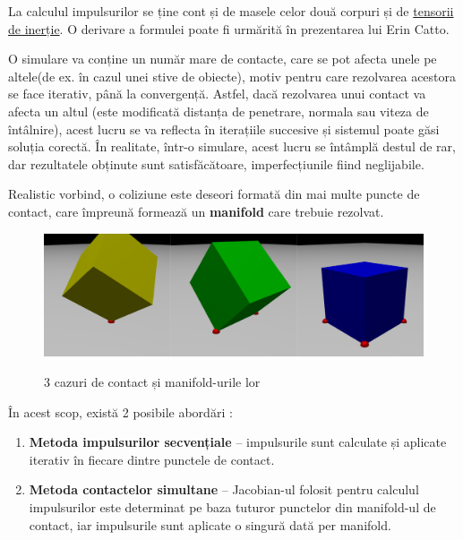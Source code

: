 \documentclass[12pt,a4paper]{report}
\begin{document}
La calculul impulsurilor se ține cont și de masele celor două corpuri și de \hyperref[inertia_tensor]{tensorii de inerție}. O derivare a formulei poate fi urmărită în prezentarea lui Erin Catto\cite{constraints_catto}.


O simulare va conține un număr mare de contacte, care se pot afecta unele pe altele(de ex. în cazul unei stive de obiecte), motiv pentru care rezolvarea acestora se face iterativ, până la convergență. Astfel, dacă rezolvarea unui contact va afecta un altul (este modificată distanța de penetrare, normala sau viteza de întâlnire), acest lucru se va reflecta în iterațiile succesive și sistemul poate găsi soluția corectă. În realitate, într-o simulare, acest lucru se întâmplă destul de rar, dar rezultatele obținute sunt satisfăcătoare, imperfecțiunile fiind neglijabile.

Realistic vorbind, o coliziune este deseori formată din mai multe puncte de contact, care împreună formează un \textbf{manifold} care trebuie rezolvat.
\begin{figure}[H]
	\centering
	\includegraphics[width=0.7\linewidth]{pics/cap3_03.png}
	\label{fig:cap3_03}
	\caption[]{3 cazuri de contact și manifold-urile lor}
\end{figure}
În acest scop, există 2 posibile abordări \cite[Secțiunea 6.6.2~\textit{Collision response for colliding contact}]{game_physics_eberly}:
\begin{enumerate}
	\item \textbf{Metoda impulsurilor secvențiale} -- impulsurile sunt calculate și aplicate iterativ în fiecare dintre punctele de contact.
	\item \textbf{Metoda contactelor simultane} -- Jacobian-ul folosit pentru calculul impulsurilor este determinat pe baza tuturor punctelor din manifold-ul de contact, iar impulsurile sunt aplicate o singură dată per manifold.
\end{enumerate}
\end{document}

